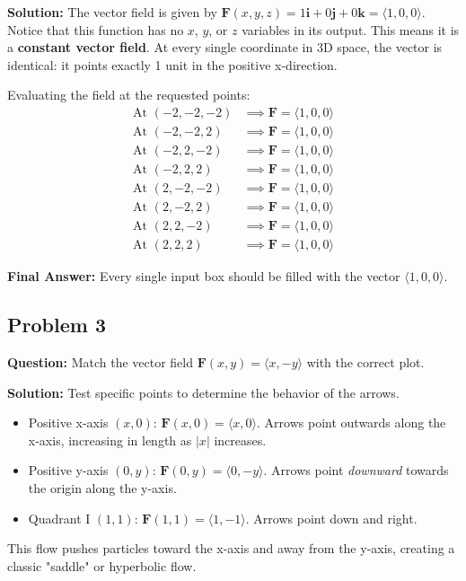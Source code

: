 \documentclass[11pt]{article}
\begin{document}
\textbf{Solution:}
The vector field is given by $\mathbf{F}(x, y, z) = 1\mathbf{i} + 0\mathbf{j} + 0\mathbf{k} = \langle 1, 0, 0 \rangle$.
Notice that this function has no $x$, $y$, or $z$ variables in its output. This means it is a \textbf{constant vector field}. At every single coordinate in 3D space, the vector is identical: it points exactly 1 unit in the positive x-direction.

Evaluating the field at the requested points:
\begin{align*}
    \text{At } (-2, -2, -2) &\implies \mathbf{F} = \langle 1, 0, 0 \rangle \\
    \text{At } (-2, -2, 2)  &\implies \mathbf{F} = \langle 1, 0, 0 \rangle \\
    \text{At } (-2, 2, -2)  &\implies \mathbf{F} = \langle 1, 0, 0 \rangle \\
    \text{At } (-2, 2, 2)   &\implies \mathbf{F} = \langle 1, 0, 0 \rangle \\
    \text{At } (2, -2, -2)  &\implies \mathbf{F} = \langle 1, 0, 0 \rangle \\
    \text{At } (2, -2, 2)   &\implies \mathbf{F} = \langle 1, 0, 0 \rangle \\
    \text{At } (2, 2, -2)   &\implies \mathbf{F} = \langle 1, 0, 0 \rangle \\
    \text{At } (2, 2, 2)    &\implies \mathbf{F} = \langle 1, 0, 0 \rangle
\end{align*}

\textbf{Final Answer:} Every single input box should be filled with the vector $\langle 1, 0, 0 \rangle$.

\subsection*{Problem 3}
\textbf{Question:} Match the vector field $\mathbf{F}(x, y) = \langle x, -y \rangle$ with the correct plot.

\textbf{Solution:}
Test specific points to determine the behavior of the arrows.
\begin{itemize}
    \item Positive x-axis $(x, 0)$: $\mathbf{F}(x, 0) = \langle x, 0 \rangle$. Arrows point outwards along the x-axis, increasing in length as $|x|$ increases.
    \item Positive y-axis $(0, y)$: $\mathbf{F}(0, y) = \langle 0, -y \rangle$. Arrows point \textit{downward} towards the origin along the y-axis.
    \item Quadrant I $(1, 1)$: $\mathbf{F}(1, 1) = \langle 1, -1 \rangle$. Arrows point down and right.
\end{itemize}
This flow pushes particles toward the x-axis and away from the y-axis, creating a classic "saddle" or hyperbolic flow.
\end{document}
